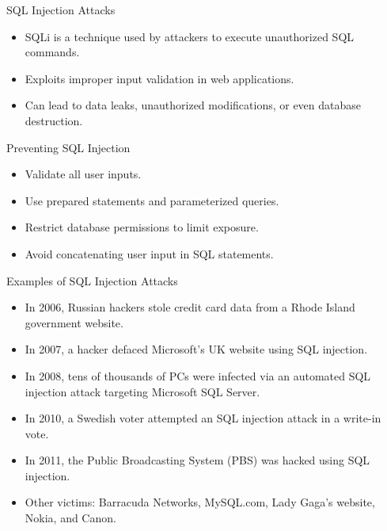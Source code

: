 \documentclass[aspectratio=169]{beamer}
\begin{document}
\begin{frame}{SQL Injection Attacks}
    \begin{itemize}
        \item SQLi is a technique used by attackers to execute unauthorized SQL commands.
        \item Exploits improper input validation in web applications.
        \item Can lead to data leaks, unauthorized modifications, or even database destruction.
    \end{itemize}
\end{frame}

\begin{frame}{Preventing SQL Injection}
    \begin{itemize}
        \item Validate all user inputs.
        \item Use prepared statements and parameterized queries.
        \item Restrict database permissions to limit exposure.
        \item Avoid concatenating user input in SQL statements.
    \end{itemize}
\end{frame}

\begin{frame}{Examples of SQL Injection Attacks}
    \begin{itemize}
        \item In 2006, Russian hackers stole credit card data from a Rhode Island government website.
        \item In 2007, a hacker defaced Microsoft's UK website using SQL injection.
        \item In 2008, tens of thousands of PCs were infected via an automated SQL injection attack targeting Microsoft SQL Server.
        \item In 2010, a Swedish voter attempted an SQL injection attack in a write-in vote.
        \item In 2011, the Public Broadcasting System (PBS) was hacked using SQL injection.
        \item Other victims: Barracuda Networks, MySQL.com, Lady Gaga’s website, Nokia, and Canon.
    \end{itemize}
\end{frame}
\end{document}
